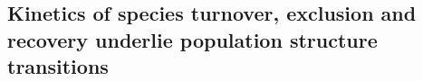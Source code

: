 \documentclass[9pt,twocolumn,twoside,lineno]{pnas-new}
\begin{document}








\subsection{Kinetics of species turnover, exclusion and recovery underlie population structure transitions}
\label{sec:Dynamics}
\end{document}

